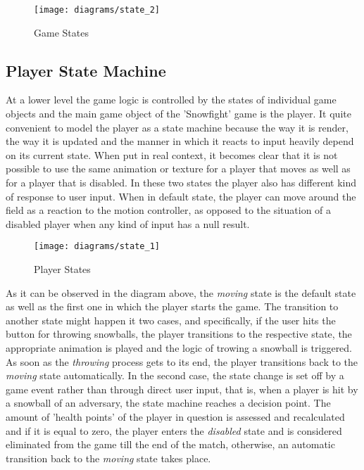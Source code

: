 \begin{figure}[!h]
\centering
\texttt{[image: diagrams/state\_2]}
\caption{Game States}\label{diag:state_2}
\end{figure}

\newpage

\subsection{Player State Machine}

At a lower level the game logic is controlled by the states of individual game
objects and the main game object of the 'Snowfight' game is the player. It quite
convenient to model the player as a state machine because the way it is render,
the way it is updated and the manner in which it reacts to input heavily depend
on its current state. When put in real context, it becomes clear that it is not
possible to use the same animation or texture for a player that moves as well as
for a player that is disabled. In these two states the player also has different
kind of response to user input. When in default state, the player can move
around the field as a reaction to the motion controller, as opposed to the
situation of a disabled player when any kind of input has a null result.

\begin{figure}[!h]
\centering
\texttt{[image: diagrams/state\_1]}
\caption{Player States}\label{diag:state_1}
\end{figure}

As it can be observed in the diagram above, the \emph{moving} state is the
default state as well as the first one in which the player starts the game. The
transition to another state might happen it two cases, and specifically, if the
user hits the button for throwing snowballs, the player transitions to the
respective state, the appropriate animation is played and the logic of trowing a
snowball is triggered. As soon as the \emph{throwing} process gets to its end,
the player transitions back to the \emph{moving} state automatically. In the
second case, the state change is set off by a game event rather than through
direct user input, that is, when a player is hit by a snowball of an adversary,
the state machine reaches a decision point. The amount of 'health points' of the
player in question is assessed and recalculated and if it is equal to zero, the
player enters the \emph{disabled} state and is considered eliminated from the
game till the end of the match, otherwise, an automatic transition back to the
\emph{moving} state takes place.

